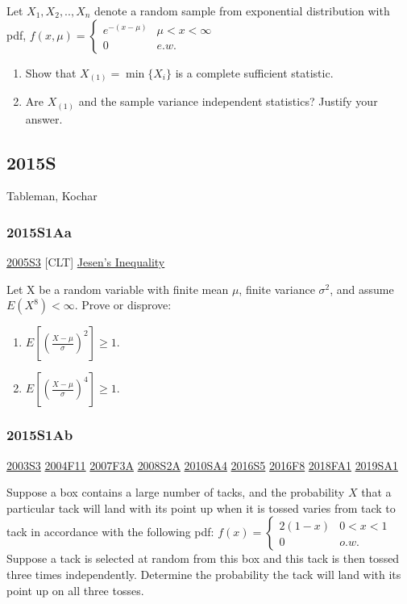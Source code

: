 \documentclass[10pt,twocolumn,portrait]{article}
\begin{document}
Let \(X_1,X_2,..,X_{n}\) denote a random sample from exponential
distribution with pdf,
\(f(x,\mu)=\begin{cases}e^{-(x-\mu)}& \mu<x<\infty\\0& e.w.\end{cases}\)

\begin{enumerate}
\def\labelenumi{(\alph{enumi})}
\item
  Show that \(X_{(1)}=\min\{X_i\}\) is a complete sufficient statistic.
\item
  Are \(X_{(1)}\) and the sample variance independent statistics?
  Justify your answer.
\end{enumerate}

\hypertarget{s-8}{%
\subsection{2015S}\label{s-8}}

Tableman, Kochar

\hypertarget{s1aa}{%
\subsubsection{2015S1Aa}\label{s1aa}}

\protect\hyperlink{s3-1}{2005S3} {[}CLT{]}
\protect\hyperlink{Jens}{Jesen's Inequality}

Let X be a random variable with finite mean \(\mu\), finite variance
\(\sigma^2\), and assume \(E(X^8)<\infty\). Prove or disprove:

\begin{enumerate}
\def\labelenumi{\roman{enumi}.}
\item
  \(E[(\frac{X-\mu}{\sigma})^2]\ge1\).
\item
  \(E[(\frac{X-\mu}{\sigma})^4]\ge1\).
\end{enumerate}

\hypertarget{s1ab}{%
\subsubsection{2015S1Ab}\label{s1ab}}

\protect\hyperlink{s3}{2003S3} \protect\hyperlink{f11}{2004F11}
\protect\hyperlink{f3a}{2007F3A} \protect\hyperlink{s2a}{2008S2A}
\protect\hyperlink{sa4-1}{2010SA4} \protect\hyperlink{s5-4}{2016S5}
\protect\hyperlink{f8-4}{2016F8} \protect\hyperlink{fa1-4}{2018FA1}
\protect\hyperlink{sa1-3}{2019SA1}

Suppose a box contains a large number of tacks, and the probability
\(X\) that a particular tack will land with its point up when it is
tossed varies from tack to tack in accordance with the following pdf:
\(f(x)=\begin{cases}2(1-x)&0<x<1\\0& o.w.\end{cases}\) Suppose a tack is
selected at random from this box and this tack is then tossed three
times independently. Determine the probability the tack will land with
its point up on all three tosses.
\end{document}
